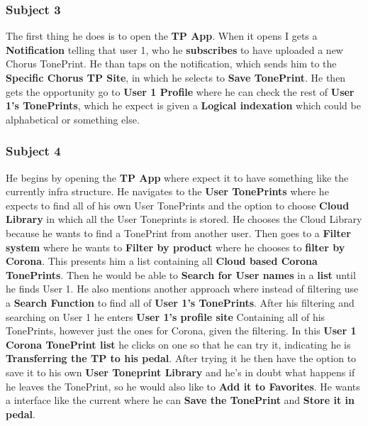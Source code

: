 \subsubsection{Subject 3}
\label{Subject3ICMM}
The first thing he does is to open the \textbf{TP App}. When it opens I gets a \textbf{Notification} telling that user 1, who he \textbf{subscribes} to have uploaded a new Chorus TonePrint. He than taps on the notification, which sends him to the \textbf{Specific Chorus TP Site}, in which he selects to \textbf{Save TonePrint}. He then gets the opportunity go to \textbf{User 1 Profile} where he can check the rest of \textbf{User 1’s TonePrints}, which he expect is given a \textbf{Logical indexation} which could be alphabetical or something else.

\subsubsection{Subject 4}
\label{Subject4ICMM}
He begins by opening the \textbf{TP App} where expect it to have something like the currently infra structure. He navigates to the \textbf{User TonePrints} where he expects to find all of his own User TonePrints and the option to choose \textbf{Cloud Library} in which all the User Toneprints is stored. He chooses the Cloud Library because he wants to find a TonePrint from another user. Then goes to a \textbf{Filter system} where he wants to \textbf{Filter by product} where he chooses to \textbf{filter by Corona}. This presents him a list containing all \textbf{Cloud based Corona TonePrints}. Then he would be able to \textbf{Search for User names} in a \textbf{list} until he finds User 1. He also mentions another approach where instead of filtering use a \textbf{Search Function} to find all of \textbf{User 1’s TonePrints}. After his filtering and searching on User 1 he enters \textbf{User 1’s profile site} Containing all of his TonePrints, however just the ones for Corona, given the filtering. In this \textbf{User 1 Corona TonePrint list} he clicks on one so that he can try it, indicating he is \textbf{Transferring the TP to his pedal}. After trying it he then have the option to save it to his own \textbf{User Toneprint Library} and he’s in doubt what happens if he leaves the TonePrint, so he would also like to \textbf{Add it to Favorites}. He wants a interface like the current where he can \textbf{Save the TonePrint} and \textbf{Store it in pedal}.

